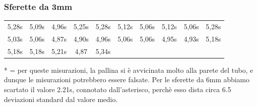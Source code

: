 \subsubsection{Sferette da 3mm}

\begin{tabular}{c|c|c|c|c|c|c|c|c|c}
\toprule
 5,28s & 5,09s & 4,96s & 5,25s & 5,28s & 5,12s & 5,06s & 5,12s & 5,06s & 5,28s \\
 5,03s & 5,06s & 4,87s & 4,90s & 4,96s & 5,06s & 5,06s & 4,95s & 4,93s & 5,18s \\
 5,18s & 5,18s & 5,21s & 4,87 & 5,34s &  &  &  &  & \\
\bottomrule
\end{tabular}


* = per queste misurazioni, la pallina si è avvicinata molto alla parete del tubo, e dunque le misurazioni potrebbero essere falsate.
Per le sferette da 6mm abbiamo scartato il valore 2.21s, connotato dall'asterisco, perchè esso dista circa 6.5 deviazioni standard dal valore medio.

